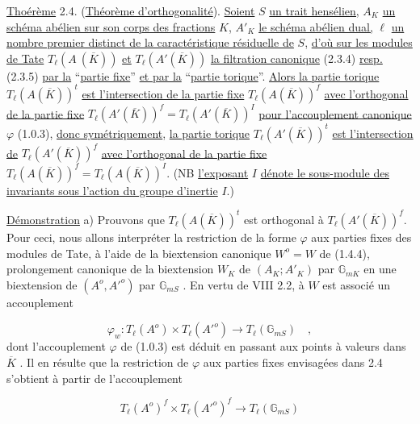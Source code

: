\underline{Thoérème} 2.4. (\underline{Théorème d'orthogonalité}). \underline{Soient} $S$ \underline{un trait hensélien,} $A_K$ \underline{un schéma abélien sur son corps des fractions} $K$, $A'_K$ \underline{le schéma abélien dual,} $\ell$ \underline{un nombre premier distinct de la caractéristique résiduelle de} $S$, \underline{d'où sur les modules de Tate} $T_\ell(A\ (\overline{K}))$ \underline{et} $T_\ell(A'(\overline{K}))$ \underline{la filtration canonique} (2.3.4) \underline{resp.} (2.3.5) \underline{par la} ``\underline{partie fixe}'' \underline{et par la} ``\underline{partie torique}''. \underline{Alors la partie torique} $T_\ell(A(\overline{K}))^t$ \underline{est l'intersection de la partie fixe} $T_\ell(A(\overline{K}))^f$ \underline{avec l'orthogonal de la partie fixe} $T_\ell(A'(\overline{K}))^f = T_\ell(A'(\overline{K}))^I$ \underline{pour l'accouplement canonique} $\varphi$ (1.0.3), \underline{donc symétriquement}, \underline{la partie torique} $T_\ell(A'(\overline{K}))^t$ \underline{est l'intersection de} $T_\ell(A'(\overline{K}))^f$ \underline{avec l'orthogonal de la partie fixe} $T_\ell(A(\overline{K}))^f = T_\ell(A(\overline{K}))^I$. (NB \underline{l'exposant} $I$ \underline{dénote le sous-module des invariants sous l'action du groupe d'inertie} $I$.)

\underline{Démonstration} \quad a) \quad Prouvons que $T_\ell(A(\overline{K}))^t$ est orthogonal à $T_\ell(A'(\overline{K}))^f$. Pour ceci, nous allons interpréter la restriction de la forme $\varphi$ aux parties fixes des modules de Tate, à l'aide de la biextension canonique $W^o = W$ de (1.4.4), prolongement canonique de la biextension $W_K$ de $(A_K ; A'_K)$ par $\mathbb{G}_{mK}$ en une biextension de $(A^o , {A'}^o)$ par $\mathbb{G}_{mS}$ . En vertu de VIII 2.2, à $W$ est associé un accouplement

\begin{equation}\tag{2.4.1}
\varphi_w : T_\ell(A^o) \times T_\ell({A'}^o) \longrightarrow T_\ell(\mathbb{G}_{mS}) \quad ,
\end{equation}
dont l'accouplement $\varphi$ de (1.0.3) est déduit en passant aux points à valeurs dans $\overline{K}$ . Il en résulte que la restriction de $\varphi$ aux parties fixes envisagées dans 2.4 s'obtient à partir de l'accouplement

\begin{equation}\tag{2.4.2}
T_\ell(A^o)^f \times T_\ell({A'}^o)^f \longrightarrow T_\ell(\mathbb{G}_{mS})
\end{equation}


